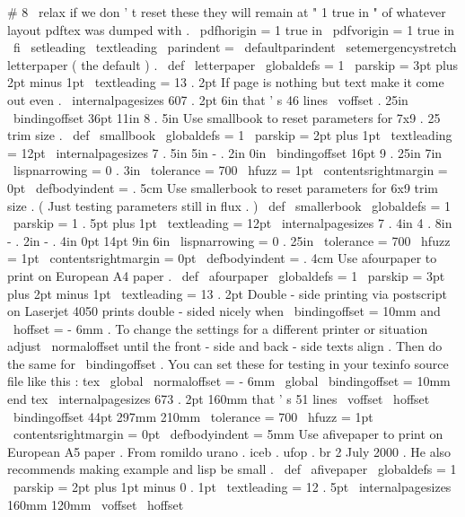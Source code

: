 {{{{{#
8
\
relax
%
if
we
don
'
t
reset
these
they
will
remain
at
"
1
true
in
"
of
%
whatever
layout
pdftex
was
dumped
with
.
\
pdfhorigin
=
1
true
in
\
pdfvorigin
=
1
true
in
\
fi
%
\
setleading
{
\
textleading
}
%
\
parindent
=
\
defaultparindent
\
setemergencystretch
}
%
letterpaper
(
the
default
)
.
\
def
\
letterpaper
{
{
\
globaldefs
=
1
\
parskip
=
3pt
plus
2pt
minus
1pt
\
textleading
=
13
.
2pt
%
%
If
page
is
nothing
but
text
make
it
come
out
even
.
\
internalpagesizes
{
607
.
2pt
}
{
6in
}
%
that
'
s
46
lines
{
\
voffset
}
{
.
25in
}
%
{
\
bindingoffset
}
{
36pt
}
%
{
11in
}
{
8
.
5in
}
%
}
}
%
Use
smallbook
to
reset
parameters
for
7x9
.
25
trim
size
.
\
def
\
smallbook
{
{
\
globaldefs
=
1
\
parskip
=
2pt
plus
1pt
\
textleading
=
12pt
%
\
internalpagesizes
{
7
.
5in
}
{
5in
}
%
{
-
.
2in
}
{
0in
}
%
{
\
bindingoffset
}
{
16pt
}
%
{
9
.
25in
}
{
7in
}
%
%
\
lispnarrowing
=
0
.
3in
\
tolerance
=
700
\
hfuzz
=
1pt
\
contentsrightmargin
=
0pt
\
defbodyindent
=
.
5cm
}
}
%
Use
smallerbook
to
reset
parameters
for
6x9
trim
size
.
%
(
Just
testing
parameters
still
in
flux
.
)
\
def
\
smallerbook
{
{
\
globaldefs
=
1
\
parskip
=
1
.
5pt
plus
1pt
\
textleading
=
12pt
%
\
internalpagesizes
{
7
.
4in
}
{
4
.
8in
}
%
{
-
.
2in
}
{
-
.
4in
}
%
{
0pt
}
{
14pt
}
%
{
9in
}
{
6in
}
%
%
\
lispnarrowing
=
0
.
25in
\
tolerance
=
700
\
hfuzz
=
1pt
\
contentsrightmargin
=
0pt
\
defbodyindent
=
.
4cm
}
}
%
Use
afourpaper
to
print
on
European
A4
paper
.
\
def
\
afourpaper
{
{
\
globaldefs
=
1
\
parskip
=
3pt
plus
2pt
minus
1pt
\
textleading
=
13
.
2pt
%
%
Double
-
side
printing
via
postscript
on
Laserjet
4050
%
prints
double
-
sided
nicely
when
\
bindingoffset
=
10mm
and
\
hoffset
=
-
6mm
.
%
To
change
the
settings
for
a
different
printer
or
situation
adjust
%
\
normaloffset
until
the
front
-
side
and
back
-
side
texts
align
.
Then
%
do
the
same
for
\
bindingoffset
.
You
can
set
these
for
testing
in
%
your
texinfo
source
file
like
this
:
%
tex
%
\
global
\
normaloffset
=
-
6mm
%
\
global
\
bindingoffset
=
10mm
%
end
tex
\
internalpagesizes
{
673
.
2pt
}
{
160mm
}
%
that
'
s
51
lines
{
\
voffset
}
{
\
hoffset
}
%
{
\
bindingoffset
}
{
44pt
}
%
{
297mm
}
{
210mm
}
%
%
\
tolerance
=
700
\
hfuzz
=
1pt
\
contentsrightmargin
=
0pt
\
defbodyindent
=
5mm
}
}
%
Use
afivepaper
to
print
on
European
A5
paper
.
%
From
romildo
urano
.
iceb
.
ufop
.
br
2
July
2000
.
%
He
also
recommends
making
example
and
lisp
be
small
.
\
def
\
afivepaper
{
{
\
globaldefs
=
1
\
parskip
=
2pt
plus
1pt
minus
0
.
1pt
\
textleading
=
12
.
5pt
%
\
internalpagesizes
{
160mm
}
{
120mm
}
%
{
\
voffset
}
{
\
hoffset
}}}}}}}
